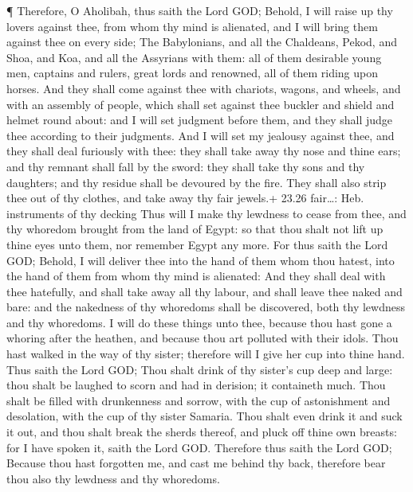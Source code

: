  ¶ Therefore, O Aholibah, thus saith the Lord GOD; Behold,
I will raise up thy lovers against thee, from whom thy mind is
alienated, and I will bring them against thee on every side;
 The Babylonians, and all the Chaldeans, Pekod, and Shoa,
and Koa, and all the Assyrians with them: all of them desirable young
men, captains and rulers, great lords and renowned, all of them riding
upon horses.  And they shall come against thee with
chariots, wagons, and wheels, and with an assembly of people, which
shall set against thee buckler and shield and helmet round about: and I
will set judgment before them, and they shall judge thee according to
their judgments.  And I will set my jealousy against thee,
and they shall deal furiously with thee: they shall take away thy nose
and thine ears; and thy remnant shall fall by the sword: they shall take
thy sons and thy daughters; and thy residue shall be devoured by the
fire.  They shall also strip thee out of thy clothes, and
take away thy fair jewels.+ 23.26 fair\ldots: Heb. instruments of thy
decking  Thus will I make thy lewdness to cease from thee,
and thy whoredom brought from the land of Egypt: so that thou shalt not
lift up thine eyes unto them, nor remember Egypt any more. 
For thus saith the Lord GOD; Behold, I will deliver thee into the hand
of them whom thou hatest, into the hand of them from whom thy mind is
alienated:  And they shall deal with thee hatefully, and
shall take away all thy labour, and shall leave thee naked and bare: and
the nakedness of thy whoredoms shall be discovered, both thy lewdness
and thy whoredoms.  I will do these things unto thee,
because thou hast gone a whoring after the heathen, and because thou art
polluted with their idols.  Thou hast walked in the way of
thy sister; therefore will I give her cup into thine hand. 
Thus saith the Lord GOD; Thou shalt drink of thy sister's cup deep and
large: thou shalt be laughed to scorn and had in derision; it containeth
much.  Thou shalt be filled with drunkenness and sorrow,
with the cup of astonishment and desolation, with the cup of thy sister
Samaria.  Thou shalt even drink it and suck it out, and
thou shalt break the sherds thereof, and pluck off thine own breasts:
for I have spoken it, saith the Lord GOD.  Therefore thus
saith the Lord GOD; Because thou hast forgotten me, and cast me behind
thy back, therefore bear thou also thy lewdness and thy whoredoms.

